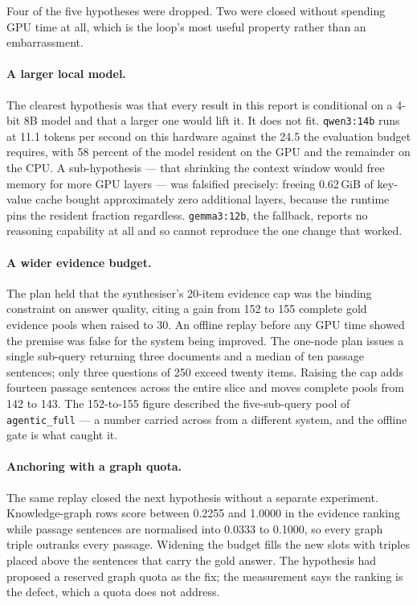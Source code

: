 Four of the five hypotheses were dropped. Two were closed without spending GPU
time at all, which is the loop's most useful property rather than an
embarrassment.

\paragraph{A larger local model.} The clearest hypothesis was that every result
in this report is conditional on a 4-bit 8B model and that a larger one would
lift it. It does not fit. \texttt{qwen3:14b} runs at 11.1 tokens per second on
this hardware against the 24.5 the evaluation budget requires, with 58 percent
of the model resident on the GPU and the remainder on the CPU. A sub-hypothesis
--- that shrinking the context window would free memory for more GPU layers ---
was falsified precisely: freeing 0.62\,GiB of key-value cache bought
approximately zero additional layers, because the runtime pins the resident
fraction regardless. \texttt{gemma3:12b}, the fallback, reports no reasoning
capability at all and so cannot reproduce the one change that worked.

\paragraph{A wider evidence budget.} The plan held that the synthesiser's
20-item evidence cap was the binding constraint on answer quality, citing a
gain from 152 to 155 complete gold evidence pools when raised to 30. An offline
replay before any GPU time showed the premise was false for the system being
improved. The one-node plan issues a single sub-query returning three documents
and a median of ten passage sentences; only three questions of 250 exceed twenty
items. Raising the cap adds fourteen passage sentences across the entire slice
and moves complete pools from 142 to 143. The 152-to-155 figure described the
five-sub-query pool of \texttt{agentic\_full} --- a number carried across from a
different system, and the offline gate is what caught it.

\paragraph{Anchoring with a graph quota.} The same replay closed the next
hypothesis without a separate experiment. Knowledge-graph rows score between
0.2255 and 1.0000 in the evidence ranking while passage sentences are
normalised into 0.0333 to 0.1000, so every graph triple outranks every passage.
Widening the budget fills the new slots with triples placed above the sentences
that carry the gold answer. The hypothesis had proposed a reserved graph quota
as the fix; the measurement says the ranking is the defect, which a quota does
not address.

